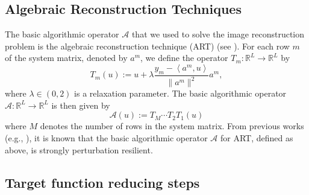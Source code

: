 \documentclass[smallextended]{svjour3}      %
\begin{document}
\subsection{Algebraic Reconstruction Techniques}

The basic algorithmic operator $\mathcal{A}$ that we used to solve the image reconstruction problem is the algebraic reconstruction technique (ART) (see \cite[Chapter 11]{herman2009book}). For each row $m$ of the system matrix, denoted by $a^{m}$, we define the operator $T_{m}:\mathbb{R}^{L}\rightarrow\mathbb{R}^{L}$ by
\begin{equation}
T_{m}(u):=u+\lambda\dfrac{y_{m}-\left\langle a^{m},u\right\rangle }{\|a^{m}\|^{2}}a^{m},
\end{equation}
where $\lambda\in(0,2)$ is a relaxation parameter. The basic algorithmic operator $\mathcal{A}:\mathbb{R}^{L}\rightarrow\mathbb{R}^{L}$ is then given by
\begin{equation}
\mathcal{A}(u):=T_{M}\cdots T_{2}T_{1}(u)
\end{equation}
where $M$ denotes the number of rows in the system matrix. From previous works (e.g., \cite{censor2014projectedsubgrad}), it is known that the basic algorithmic operator $\mathcal{A}$ for ART, defined as above, is strongly perturbation resilient.

\subsection{Target function reducing steps\label{subsec:Target-Function-Reducing}}
\end{document}
